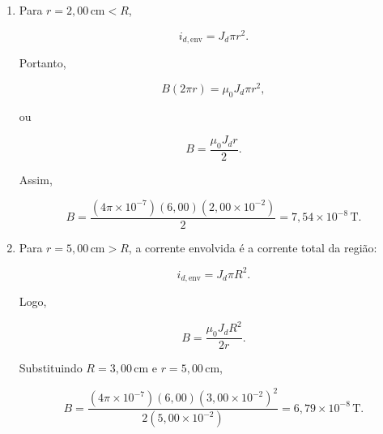 \begin{enumerate}
    \item[(a)] Para \(r=2{,}00\,\text{cm}<R\),

    \[
    i_{d,\text{env}}=J_d\pi r^2.
    \]

    Portanto,

    \[
    B(2\pi r)=\mu_0J_d\pi r^2,
    \]

    ou

    \[
    B=\frac{\mu_0J_dr}{2}.
    \]

    Assim,

    \[
    B=
    \frac{(4\pi\times 10^{-7})(6{,}00)(2{,}00\times 10^{-2})}{2}
    =
    7{,}54\times 10^{-8}\,\text{T}.
    \]

    \item[(b)] Para \(r=5{,}00\,\text{cm}>R\), a corrente envolvida é a
    corrente total da região:

    \[
    i_{d,\text{env}}=J_d\pi R^2.
    \]

    Logo,

    \[
    B=
    \frac{\mu_0J_dR^2}{2r}.
    \]

    Substituindo \(R=3{,}00\,\text{cm}\) e \(r=5{,}00\,\text{cm}\),

    \[
    B=
    \frac{(4\pi\times 10^{-7})(6{,}00)(3{,}00\times 10^{-2})^2}
    {2(5{,}00\times 10^{-2})}
    =
    6{,}79\times 10^{-8}\,\text{T}.
    \]
\end{enumerate}

\vspace{1cm}
